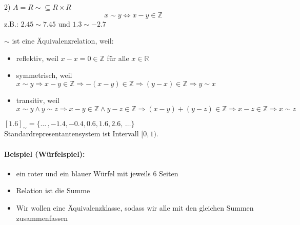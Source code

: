 \documentclass[10pt,a4paper]{article}
\begin{document}
2) $A=R \sim \subseteq R \times R$
\[
x\sim y \Leftrightarrow x-y \in \mathbb{Z}
\]
z.B.: $2.45 \sim 7.45$ und $1.3 \sim -2.7$

$\sim$ ist eine Äquivalenzrelation, weil:
\begin{itemize}
\item reflektiv, weil $x-x = 0 \in \mathbb{Z}$ für alle $x\in\mathbb{R}$
\item symmetrisch, weil $x\sim y \Rightarrow x-y \in \mathbb{Z} \Rightarrow -(x-y) \in \mathbb{Z} \Rightarrow  (y-x) \in \mathbb{Z} \Rightarrow y\sim x$
\item transitiv, weil $x\sim y \land y\sim z \Rightarrow x-y \in \mathbb{Z} \land y-z \in \mathbb{Z} \Rightarrow (x-y)+(y-z)\in \mathbb{Z} \Rightarrow x-z \in \mathbb{Z} \Rightarrow x\sim z$
\end{itemize}

$[1.6]_{\sim} = \{ \ldots\, , -1.4, -0.4, 0.6, 1.6, 2.6,\, \ldots \}$\\
Standardrepresentantensystem ist Intervall $[0,1)$.


\paragraph{Beispiel (Würfelspiel): }
\begin{itemize}
\item ein roter und ein blauer Würfel mit jeweils $6$ Seiten
\item Relation ist die Summe
\item Wir wollen eine Äquivalenzklasse, sodass wir alle mit den gleichen Summen zusammenfassen
\end{itemize}

\newpage
\end{document}

